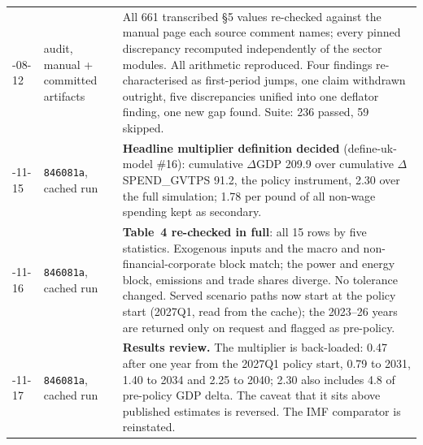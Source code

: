 \begin{longtable}{@{}l>{\raggedright\arraybackslash}p{}>{\raggedright\arraybackslash}p{}@{}}
\addlinespace
2026-08-12 & audit, manual + committed artifacts & All 661 transcribed \S5 values re-checked against the manual page each source comment names; every pinned discrepancy recomputed independently of the sector modules. All arithmetic reproduced. Four findings re-characterised as first-period jumps, one claim withdrawn outright, five discrepancies unified into one deflator finding, one new gap found. Suite: 236 passed, 59 skipped. \\
\addlinespace
2026-11-15 & \texttt{846081a}, cached run & \textbf{Headline multiplier definition decided} (define-uk-model \#16): cumulative $\Delta$GDP 209.9 over cumulative $\Delta$SPEND\_GVTPS 91.2, the policy instrument, 2.30 over the full simulation; 1.78 per pound of all non-wage spending kept as secondary. \\
\addlinespace
2026-11-16 & \texttt{846081a}, cached run & \textbf{Table~4 re-checked in full}: all 15 rows by five statistics. Exogenous inputs and the macro and non-financial-corporate block match; the power and energy block, emissions and trade shares diverge. No tolerance changed. Served scenario paths now start at the policy start (2027Q1, read from the cache); the 2023--26 years are returned only on request and flagged as pre-policy. \\
\addlinespace
2026-11-17 & \texttt{846081a}, cached run & \textbf{Results review.} The multiplier is back-loaded: 0.47 after one year from the 2027Q1 policy start, 0.79 to 2031, 1.40 to 2034 and 2.25 to 2040; 2.30 also includes 4.8 of pre-policy GDP delta. The caveat that it sits above published estimates is reversed. The IMF comparator \citep{batini2021} is reinstated. \\
\end{longtable}
